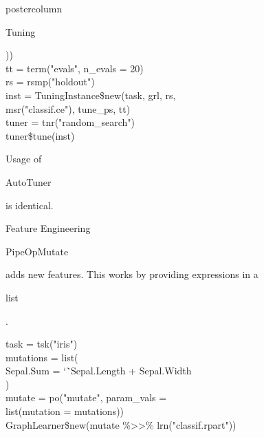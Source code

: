 \documentclass{beamer}
\newcommand{\codeinline}[1]{\begin{codeboxinline}#1\end{codeboxinline}}
\begin{document}
\begin{frame}[fragile]{}
\begin{columns}
\begin{column}{.245\textwidth}
\begin{beamercolorbox}[center]{postercolumn}
\begin{minipage}{.98\textwidth}
{\begin{myblock}{Tuning}
\begin{codeboxexample}
{                ))\\
                tt = term("evals", n\_evals = 20)\\
                rs = rsmp("holdout")\\
                inst = TuningInstance\$new(task, grl, rs,\\
                \hspace*{1ex} msr("classif.ce"), tune\_ps, tt)\\
                tuner = tnr("random\_search")\\
                tuner\$tune(inst)
                }
              \end{codeboxexample}
              \vspace{1.0em}
              Usage of \codeinline{AutoTuner} is identical.
            \end{myblock}
            \vspace{-1.0em}
            \begin{myblock}{Feature Engineering}
              \codeinline{PipeOpMutate} adds new features.
              This works by providing expressions in a \codeinline{list}.
              \\
              \begin{codeboxexample}
                \footnotesize{
                task = tsk("iris")\\
                mutations = list(\\
                \hspace*{1ex} Sepal.Sum = \char`\~ \ Sepal.Length + Sepal.Width\\
                )\\
                mutate = po("mutate", param\_vals =\\
                \hspace*{1ex} list(mutation = mutations))\\
                GraphLearner\$new(mutate \%>{}>\% lrn("classif.rpart"))
}
\end{codeboxexample}
\end{myblock}}
\end{minipage}
\end{beamercolorbox}
\end{column}
\end{columns}
\end{frame}
\end{document}
